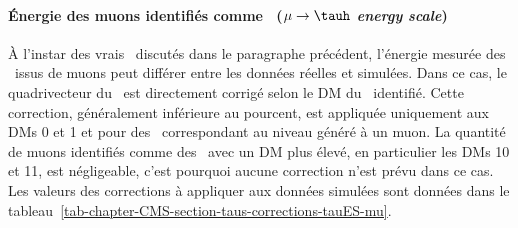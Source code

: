 \paragraph{Énergie des muons identifiés comme \tauh\ (\emph{$\mu\to\tauh$ energy scale})}
À l'instar des vrais \tauh\ discutés dans le paragraphe précédent, l'énergie mesurée des \ftauhs\ issus de muons peut différer entre les données réelles et simulées.
Dans ce cas, le quadrivecteur du \ftauh\ est directement corrigé selon le DM du \tauh\ identifié.
Cette correction, généralement inférieure au pourcent, est appliquée uniquement aux DMs 0 et 1 et pour des \tauh\ correspondant au niveau généré à un muon.
La quantité de muons identifiés comme des \tauh\ avec un DM plus élevé, en particulier les DMs 10 et 11, est négligeable, c'est pourquoi aucune correction n'est prévu dans ce cas.
Les valeurs des corrections à appliquer aux données simulées sont données dans le tableau~\ref{tab-chapter-CMS-section-taus-corrections-tauES-mu}.
